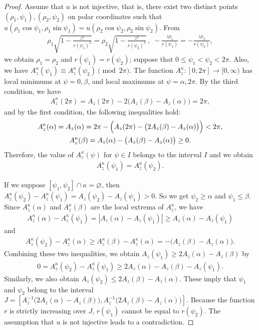 \documentclass{amsart}
\theoremstyle{plain}
\theoremstyle{definition}
\theoremstyle{remark}
\begin{document}
\begin{proof}%
Assume that $u$ is not injective, that is, there exist two distinct points $(\rho_1,\psi_1),(\rho_2,\psi_2)$ on polar coordinates such that $u(\rho_1\cos\psi_1,\rho_1\sin\psi_1)=u(\rho_2\cos\psi_2,\rho_2\sin\psi_2)$.
From
\begin{align*}
\rho_1\sqrt{1-\frac{z^2}{r(\psi_1)^2}}=\rho_2\sqrt{1-\frac{z^2}{r(\psi_2)^2}}\,,\;
-\frac{z\rho_1}{r(\psi_1)}=-\frac{z\rho_2}{r(\psi_2)}, %
\end{align*}
we obtain $\rho_1=\rho_2$ and $r(\psi_1)=r(\psi_2)$; suppose that $0\le\psi_1<\psi_2<2\pi$.
Also, we have $A_z^{\kappa}(\psi_1)\equiv A_z^{\kappa}(\psi_2)\pmod{2\pi}$.
The function $A_z^{\kappa} \colon [0,2\pi]\to[0,\infty)$ has local minimums at $\psi=0,\beta$, and local maximums at $\psi=\alpha,2\pi$.
By the third condition, we have
\begin{align*}
A_z^{\kappa}(2\pi)=A_z(2\pi)-2\bigl(A_z(\beta)-A_z(\alpha)\bigr)=2\pi,
\end{align*}
and by the first condition, the following inequalities hold:
\begin{gather*}
A_z^{\kappa}(\alpha)=A_z(\alpha)=2\pi-\Bigl(A_z(2\pi)-\bigl(2A_z(\beta)-A_z(\alpha)\bigr)\Bigr)<2\pi,\\
A_z^{\kappa}(\beta)=A_z(\alpha)-\bigl(A_z(\beta)-A_z(\alpha)\bigr)\ge0.
\end{gather*}
Therefore, the value of $A_z^{\kappa}(\psi)$ for $\psi\in I$ belongs to the interval $I$ and we obtain
\begin{align*}
A_z^{\kappa}(\psi_1)=A_z^{\kappa}(\psi_2).
\end{align*}

If we suppose $[\psi_1,\psi_2]\cap\kappa=\varnothing$, then $A_z^{\kappa}(\psi_2)-A_z^{\kappa}(\psi_1)=A_z(\psi_2)-A_z(\psi_1)>0$.
So we get $\psi_2\ge\alpha$ and $\psi_1\le\beta$.
Since $A_z^{\kappa}(\alpha)$ and $A_z^{\kappa}(\beta)$ are the local extrema of $A_z^{\kappa}$, we have
\begin{align*}
A_z^{\kappa}(\alpha)-A_z^{\kappa}(\psi_1)=|A_z(\alpha)-A_z(\psi_1)|\ge A_z(\alpha)-A_z(\psi_1)
\end{align*}
and
\begin{align*}
A_z^{\kappa}(\psi_2)-A_z^{\kappa}(\alpha)\ge A_z^{\kappa}(\beta)-A_z^{\kappa}(\alpha)=-\bigl(A_z(\beta)-A_z(\alpha)\bigr).
\end{align*}
Combining these two inequalities, we obtain $A_z(\psi_1)\ge 2A_z(\alpha)-A_z(\beta)$ by
\begin{align*}
0=A_z^{\kappa}(\psi_2)-A_z^{\kappa}(\psi_1)\ge2A_z(\alpha)-A_z(\beta)-A_z(\psi_1).
\end{align*}
Similarly, we also obtain $A_z(\psi_2)\le2A_z(\beta)-A_z(\alpha)$. These imply that $\psi_1$ and $\psi_2$ belong to the interval $J=[A_z^{-1}\bigl(2A_z(\alpha)-A_z(\beta)\bigr),A_z^{-1}\bigl(2A_z(\beta)-A_z(\alpha)\bigr)]$.
Because the function $r$ is strictly increasing over $J$, $r(\psi_1)$ cannot be equal to $r(\psi_2)$.
The assumption that $u$ is not injective leads to a contradiction. 
\end{proof}
\end{document}
